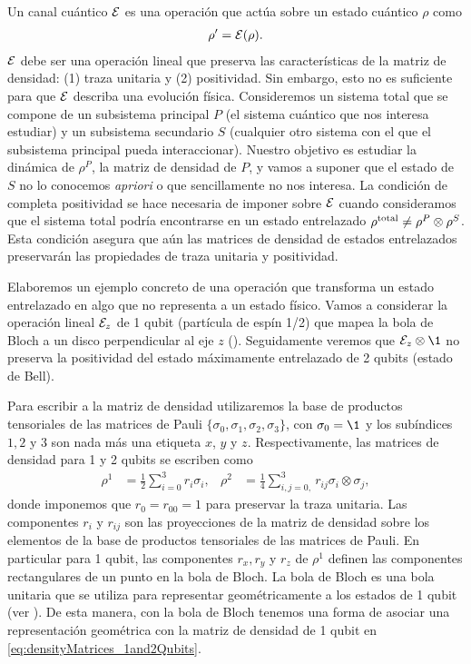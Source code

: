 Un canal cuántico $\mathcal{E}$ es una operación que actúa sobre un estado 
cuántico $\rho$ como
\begin{align} \label{eq:E(rho)}
\rho' = \mathcal{E} (\rho).
\end{align} 
$\mathcal{E}$ debe ser una operación lineal 
que preserva las características de la matriz de densidad: (1) traza
unitaria y (2) positividad. Sin embargo, esto no es suficiente para
que $\mathcal{E}$ describa una evolución física. Consideremos un sistema 
total que se compone de un subsistema principal $P$ (el sistema 
cuántico que nos interesa estudiar) y un subsistema secundario $S$
(cualquier otro sistema con el que el subsistema principal pueda 
interaccionar). Nuestro objetivo es estudiar la dinámica de $\rho^P$,
la matriz de densidad de $P$, y vamos a suponer que el 
estado de $S$ no lo conocemos \textit{apriori}
o que sencillamente no nos interesa. La condición de completa positividad
se hace necesaria de imponer sobre $\mathcal{E}$ cuando consideramos que
el sistema total podría encontrarse en un estado entrelazado  
$\rho^{\text{total}}\neq \rho^P\otimes\rho^S$. 
Esta condición asegura que aún las matrices de densidad
de estados entrelazados preservarán las propiedades de traza unitaria
y positividad.

Elaboremos un ejemplo concreto de una operación que transforma
un estado entrelazado en algo que no representa a un estado físico. 
Vamos a considerar la operación lineal $\mathcal{E}_z$ de 1 qubit (partícula
de espín 1/2) que mapea la bola de Bloch a un disco perpendicular 
al eje $z$ (). 
Seguidamente veremos que $\E_z \ot\1$ no preserva la
positividad del estado máximamente entrelazado de 2 qubits (estado de Bell).

Para escribir a la matriz de densidad utilizaremos 
la base de productos tensoriales de las matrices de Pauli
$\{ \sigma_0, \sigma_1, \sigma_2, \sigma_3\}$,
con $\sigma_0=\1$ y los subíndices $1,2$ y $3$ son nada más 
una etiqueta $x$, $y$ y $z$.
Respectivamente, las matrices de densidad para 1 y 2 qubits se 
escriben como~\cite{nielsen_chuang_2011}
\begin{align}
\rho^1&=\frac{1}{2}\sum_{i=0}^{3} r_i\sigma_i,
& 
\rho^2&=\frac{1}{4}\sum _{i,j=0, }^{3}r_{ij}\sigma_i\otimes\sigma_j,
\label{eq:densityMatrices_1and2Qubits}
\end{align}
donde imponemos que $r_0=r_{00}=1$ para preservar 
la traza unitaria. Las componentes $r_i$ y $r_{ij}$ son las proyecciones 
de la matriz de densidad sobre los elementos de la base de productos 
tensoriales de las matrices de Pauli. En particular para 1 qubit, 
las componentes $r_x, r_y$ y $r_z$ de $\rho^1$ definen 
las componentes rectangulares de un punto en la bola de Bloch.
La bola de Bloch es una bola unitaria que se utiliza para 
representar geométricamente a los estados de 1 qubit
(ver ). De esta manera, con la bola de 
Bloch tenemos una forma de asociar una representación geométrica 
con la matriz de densidad de 1 qubit en 
\eqref{eq:densityMatrices_1and2Qubits}.

